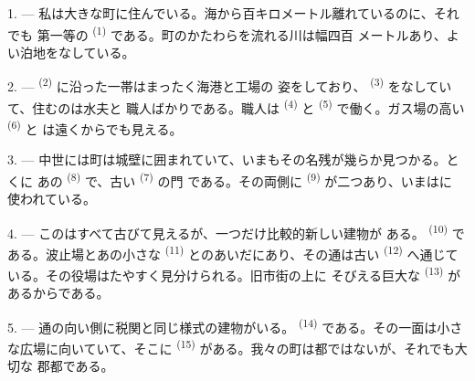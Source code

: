 %

\VUsaut{2.0mm}
\VUsaut{3.0mm}
\VUfilet{16mm}
\VUsaut{5.6mm}
\VUsaut{1.4mm}
\VUsaut{2.2mm}

\VUsaut{3.0mm}

1. --- 私は大きな町に住んでいる。海から百キロメートル離れているのに、それでも
第一等の \textsuperscript{(1)} である。町のかたわらを流れる川は幅四百
メートルあり、よい泊地をなしている。

2. ---  \textsuperscript{(2)} に沿った一帯はまったく海港と工場の
姿をしており、 \textsuperscript{(3)} をなしていて、住むのは水夫と
職人ばかりである。職人は \textsuperscript{(4)} と
\textsuperscript{(5)} で働く。ガス場の高い \textsuperscript{(6)} と
は遠くからでも見える。

3. --- 中世には町は城壁に囲まれていて、いまもその名残が幾らか見つかる。とくに
あの \textsuperscript{(8)} で、古い \textsuperscript{(7)} の門
である。その両側に \textsuperscript{(9)} が二つあり、いまはに
使われている。

4. --- このはすべて古びて見えるが、一つだけ比較的新しい建物が
ある。 \textsuperscript{(10)} である。波止場とあの小さな
\textsuperscript{(11)} とのあいだにあり、その通は古い
\textsuperscript{(12)} へ通じている。その役場はたやすく見分けられる。旧市街の上に
そびえる巨大な \textsuperscript{(13)} があるからである。

5. --- 通の向い側に税関と同じ様式の建物がいる。
\textsuperscript{(14)} である。その一面は小さな広場に向いていて、そこに
 \textsuperscript{(15)} がある。我々の町は都ではないが、それでも大切な
郡都である。

\VUsaut{5.0mm}
\VUsaut{3.4mm}

